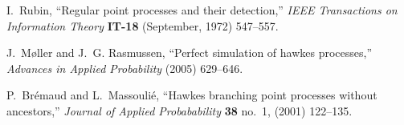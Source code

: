 \documentclass{article}
\newcommand{\tmtextbf}[1]{{\bfseries{#1}}}
\newcommand{\tmtextit}[1]{{\itshape{#1}}}
\begin{document}
\begin{thebibliography}{10}
  I.~Rubin, ``Regular point processes and their
  detection,'' \tmtextit{IEEE Transactions on Information Theory}
  \tmtextbf{IT-18} (September, 1972) 547--557.
  
  J.~M{\o}ller and J.~G. Rasmussen, ``Perfect
  simulation of hawkes processes,'' \tmtextit{Advances in Applied Probability}
  (2005) 629--646.
  
  P.~Br{\'e}maud and L.~Massouli{\'e}, ``Hawkes branching
  point processes without ancestors,'' \tmtextit{Journal of Applied
  Probabability} \tmtextbf{38} no.~1, (2001) 122--135.
\end{thebibliography}
\end{document}
